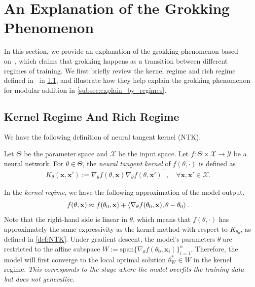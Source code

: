 \section{An Explanation of the Grokking Phenomenon}
\label{sec:explanation}

In this section, we provide an explanation of the grokking phenomenon based on~\cite{KumarBGP24}, which claims that grokking happens as a transition between different regimes of training.
We first briefly review the kernel regime and rich regime defined in~\cite{KumarBGP24} in \cref{subsec:regimes}, and illustrate how they help explain the grokking phenomenon for modular addition in \cref{subsec:explain_by_regimes}.

\subsection{Kernel Regime And Rich Regime}
\label{subsec:regimes}

We have the following definition of neural tangent kernel (NTK).

\begin{definition}
    \label{def:NTK}
    Let $\Theta$ be the parameter space and $\mathcal{X}$ be the input space.
    Let $f \colon \Theta \times \mathcal{X} \to \mathcal{Y}$ be a neural network.
    For $\theta \in \Theta$, the \emph{neural tangent kernel} of $f(\theta, \cdot)$ is defined as 
    \begin{align*}
        K_\theta(\mathbf{x}, \mathbf{x}') := \nabla_\theta f(\theta, \mathbf{x}) \nabla_\theta f(\theta, \mathbf{x}')^\top, 
        \quad \forall \mathbf{x}, \mathbf{x}' \in \mathcal{X}.
    \end{align*}
\end{definition}

In the \emph{kernel regime}, we have the following approximation of the model output, 
\begin{align*}
    f(\theta, \mathbf{x}) \approx f(\theta_0, \mathbf{x}) + \Braket{\nabla_{\theta} f(\theta_0, \mathbf{x}), \theta - \theta_0}.
\end{align*}
Note that the right-hand side is linear in $\theta$, which means that $f(\theta, \cdot)$ has approximately the same expressivity as the kernel method with respect to $K_{\theta_0}$, as defined in \cref{def:NTK}.
Under gradient descent, the model's parameters $\theta$ are restricted to the affine subspace $W := \mathrm{span}\{\nabla_{\theta} f(\theta_0, \mathbf{x}_i)\}_{i=1}^n$.
Therefore, the model will first converge to the local optimal solution $\theta_W^* \in W$ in the kernel regime.
\emph{This corresponds to the stage where the model overfits the training data but does not generalize.}

